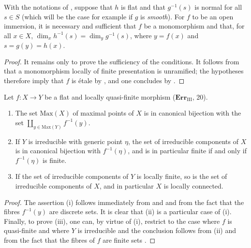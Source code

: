 \begin{corollary}[18.10.5]
\label{IV.18.10.5}
With the notations of , suppose that $h$ is flat and that $g^{-1}(s)$ is normal for all $s\in S$ \textup{(which will be the case for example if $g$ is \emph{smooth})}.
For $f$ to be an open immersion, it is necessary and sufficient that $f$ be a monomorphism and that, for all $x\in X$, $\dim_xh^{-1}(s)=\dim_yg^{-1}(s)$, where $y=f(x)$ and $s=g(y)=h(x)$.
\end{corollary}

\begin{proof}
It remains only to prove the sufficiency of the conditions. It follows from  that a monomorphism locally of finite presentation is unramified; the hypotheses therefore imply that $f$ is \'etale by , and one concludes by .
\end{proof}

\begin{lemma}[18.10.6]
\label{IV.18.10.6}
Let $f:X\to Y$ be a flat and locally quasi-finite morphism \textup{($\mathbf{Err}_{\mathrm{III}}$, 20)}.
\begin{enumerate}[label=(\roman*)]
  \item[\textup{(i)}] The set $\mathrm{Max}(X)$ of maximal points of $X$ is in canonical bijection with the set $\coprod_{y\in\mathrm{Max}(Y)}f^{-1}(y)$.
  \item[\textup{(ii)}] If $Y$ is irreducible with generic point $\eta$, the set of irreducible components of $X$ is in canonical bijection with $f^{-1}(\eta)$, and is in particular finite if and only if $f^{-1}(\eta)$ is finite.
  \item[\textup{(iii)}] If the set of irreducible components of $Y$ is locally finite, so is the set of irreducible components of $X$, and in particular $X$ is locally connected.
\end{enumerate}
\end{lemma}

\begin{proof}
The assertion (i) follows immediately from  and  and from the fact that the fibres $f^{-1}(y)$ are discrete sets.
It is clear that (ii) is a particular case of (i).
Finally, to prove (iii), one can, by virtue of (i), restrict to the case where $f$ is quasi-finite and where $Y$ is irreducible  and the conclusion follows from (ii) and from the fact that the fibres of $f$ are finite sets .
\end{proof}

